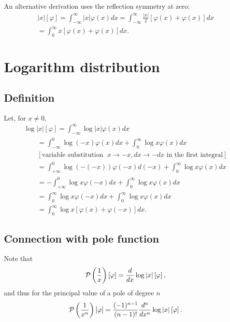An alternative derivation uses the reflection symmetry at zero:
\begin{equation}
\begin{split}
\left|x\right| \left[ \varphi \right]
=
\int_{-\infty}^\infty  \left|x\right|  \varphi(x) dx
=
\int_{-\infty}^\infty    \frac{\left|x\right|}{2}\left[\varphi(x) + \varphi (x)\right] dx   \\
=
\int_{0}^\infty  x  \left[\varphi(x) + \varphi (x)\right] dx
.
\end{split}
\end{equation}


\section{Logarithm distribution}

\subsection{Definition}
Let, for $x\neq 0$,
\begin{equation}
\begin{split}
\log \left|x\right| \left[ \varphi \right]
=
\int_{-\infty}^\infty  \log \left|x\right|  \varphi(x) dx
\\
\qquad
=
\int_{-\infty}^0 \log (-x)   \varphi(x) dx
+
\int_{0}^\infty   \log x    \varphi(x) dx
\\
\qquad
[\textrm{variable substitution }\; x\rightarrow -x, dx \rightarrow -dx \textrm{ in the first integral}]
\\
\qquad
=
\int_{+\infty}^0  \log  (-(-x))     \varphi(-x) d(-x)
+
\int_{0}^\infty   \log x    \varphi(x) dx
\\
\qquad
=
-\int_{+\infty}^0  \log x    \varphi(-x) d x
+
\int_{0}^\infty   \log x    \varphi(x) dx
\\
\qquad
=
\int_0^{\infty}  \log x    \varphi(-x) d x
+
\int_{0}^\infty   \log x    \varphi(x) dx
\\
\qquad
=
\int_0^{\infty}  \log x  \left[  \varphi(x)
+
   \varphi(-x) \right] dx
 .
\end{split}
\label{2012-m-ch-di-logdidef}
\end{equation}

\subsection{Connection with pole function}
Note that
\begin{equation}
 {\cal P} \left(\frac{1}{x}\right) \left[\varphi\right]  = \frac{d}{dx} \log \vert x \vert \left[\varphi\right]
,
\label{2014-m-ch-di-cwtpf}
\end{equation}
and thus
for the principal value of a pole of degree $n$
\begin{equation}
  {\cal P} \left(\frac{1}{x^n}\right) \left[\varphi\right]  =  \frac{(-1)^{n-1}}{(n-1)!}
\frac{d^n}{dx^n} \log \vert x \vert \left[\varphi\right]
.
\label{2014-m-ch-di-cwtpf2}
\end{equation}


